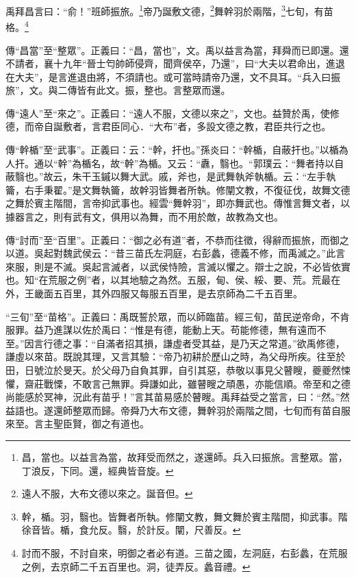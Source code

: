 禹拜昌言曰：“俞！”班師振旅。\footnote{昌，當也。以益言為當，故拜受而然之，遂還師。兵入曰振旅。言整眾。當，丁浪反，下同。還，經典皆音旋。}帝乃誕敷文德，\footnote{遠人不服，大布文德以來之。誕音但。}舞幹羽於兩階，\footnote{幹，楯。羽，翳也。皆舞者所執。修闡文教，舞文舞於賓主階間，抑武事。階徐音皆。楯，食允反。翳，於計反。闡，尺善反。}七旬，有苗格。\footnote{討而不服，不討自來，明御之者必有道。三苗之國，左洞庭，右彭蠡，在荒服之例，去京師二千五百里也。洞，徒弄反。蠡音禮。}

{\noindent\zhuan{}\fzbyks 傳“昌當”至“整眾”。正義曰：“昌，當也”，文。禹以益言為當，拜舜而已即還。還不請者，襄十九年“晉士匄帥師侵齊，聞齊侯卒，乃還”，曰“大夫以君命出，進退在大夫”，是言進退由將，不須請也。或可當時請帝乃還，文不具耳。“兵入曰振旅”，文。與二傳皆有此文。振，整也。言整眾而還。 \par}

{\noindent\zhuan{}\fzbyks 傳“遠人”至“來之”。正義曰：“遠人不服，文德以來之”，文也。益贊於禹，使修德，而帝自誕敷者，言君臣同心．“大布”者，多設文德之教，君臣共行之也。 \par}

{\noindent\zhuan{}\fzbyks 傳“幹楯”至“武事”。正義曰：云：“幹，扞也。”孫炎曰：“幹楯，自蔽扞也。”以楯為人扞。通以“幹”為楯名，故“幹”為楯。又云：“纛，翳也。“郭璞云：“舞者持以自蔽翳也。”故云，朱干玉鏚以舞大武。戚，斧也，是武舞執斧執楯。云：“左手執籥，右手秉翟。”是文舞執籥，故幹羽皆舞者所執。修闡文教，不復征伐，故舞文德之舞於賓主階間，言帝抑武事也。經雲“舞幹羽”，即亦舞武也。傳惟言舞文者，以據器言之，則有武有文，俱用以為舞，而不用於敵，故教為文也。 \par}

{\noindent\zhuan{}\fzbyks 傳“討而”至“百里”。正義曰：“御之必有道”者，不恭而往徵，得辭而振旅，而御之以道。吳起對魏武侯云：“昔三苗氏左洞庭，右彭蠡，德義不修，而禹滅之。”此言來服，則是不滅。吳起言滅者，以武侯恃險，言滅以懼之。辯士之說，不必皆依實也。知“在荒服之例”者，以其地驗之為然。五服，甸、侯、綏、要、荒。荒最在外，王畿面五百里，其外四服又每服五百里，是去京師為二千五百里。 \par}

{\noindent\shu{}\fzkt “三旬”至“苗格”。正義曰：禹既誓於眾，而以師臨苗。經三旬，苗民逆帝命，不肯服罪。益乃進謀以佐於禹曰：“惟是有德，能動上天。苟能修德，無有遠而不至。”因言行德之事：“自滿者招其損，謙虛者受其益，是乃天之常道。”欲禹修德，謙虛以來苗。既說其理，又言其驗：“帝乃初耕於歷山之時，為父母所疾。往至於田，日號泣於旻天。於父母乃自負其罪，自引其惡，恭敬以事見父瞽瞍，夔夔然悚懼，齋莊戰慄，不敢言己無罪。舜謙如此，雖瞽瞍之頑愚，亦能信順。帝至和之德尚能感於冥神，況此有苗乎！”言其苗易感於瞽瞍。禹拜益受之當言，曰：“然。”然益語也。遂還師整眾而歸。帝舜乃大布文德，舞幹羽於兩階之間，七旬而有苗自服來至。言主聖臣賢，御之有道也。 \par}

